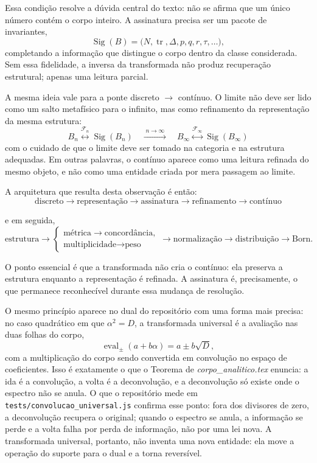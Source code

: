 \documentclass[11pt,a4paper]{article}
\begin{document}
Essa condição resolve a dúvida central do texto: não se afirma que um único número contém o corpo inteiro. A assinatura precisa ser um pacote de invariantes,
\[
\operatorname{Sig}(B)=\bigl(N,\operatorname{tr},\Delta,p,q,r,\tau,\ldots\bigr),
\]
completando a informação que distingue o corpo dentro da classe considerada. Sem essa fidelidade, a inversa da transformada não produz recuperação estrutural; apenas uma leitura parcial.

A mesma ideia vale para a ponte discreto $\to$ contínuo. O limite não deve ser lido como um salto metafísico para o infinito, mas como refinamento da representação da mesma estrutura:
\[
\boxed{
B_n
\overset{\mathcal F_n}{\longleftrightarrow}
\operatorname{Sig}(B_n)
\quad\xrightarrow{\;n\to\infty\;}
\quad
B_\infty
\overset{\mathcal F_\infty}{\longleftrightarrow}
\operatorname{Sig}(B_\infty)
}
\]
com o cuidado de que o limite deve ser tomado na categoria e na estrutura adequadas. Em outras palavras, o contínuo aparece como uma leitura refinada do mesmo objeto, e não como uma entidade criada por mera passagem ao limite.

A arquitetura que resulta desta observação é então:
\[
\boxed{
\text{discreto}
\rightarrow
\text{representação}
\rightarrow
\text{assinatura}
\rightarrow
\text{refinamento}
\rightarrow
\text{contínuo}
}
\]

e em seguida,
\[
\boxed{
\text{estrutura}
\rightarrow
\begin{cases}
\text{métrica}\rightarrow\text{concordância},\\[2mm]
\text{multiplicidade}\rightarrow\text{peso}
\end{cases}
\rightarrow
\text{normalização}
\rightarrow
\text{distribuição}
\rightarrow
\text{Born}.
}
\]

O ponto essencial é que a transformada não cria o contínuo: ela preserva a estrutura enquanto a representação é refinada. A assinatura é, precisamente, o que permanece reconhecível durante essa mudança de resolução.

O mesmo princípio aparece no dual do repositório com uma forma mais precisa: no caso quadrático em que $\alpha^2=D$, a transformada universal é a avaliação nas duas folhas do corpo,
\[
\operatorname{eval}_{\pm}(a+b\alpha)=a\pm b\sqrt{D},
\]
com a multiplicação do corpo sendo convertida em convolução no espaço de coeficientes. Isso é exatamente o que o Teorema de \emph{corpo\_analitico.tex} enuncia: a ida é a convolução, a volta é a deconvolução, e a deconvolução só existe onde o espectro não se anula. O que o repositório mede em \texttt{tests/convolucao\_universal.js} confirma esse ponto: fora dos divisores de zero, a deconvolução recupera o original; quando o espectro se anula, a informação se perde e a volta falha por perda de informação, não por uma lei nova. A transformada universal, portanto, não inventa uma nova entidade: ela move a operação do suporte para o dual e a torna reversível.
\end{document}
